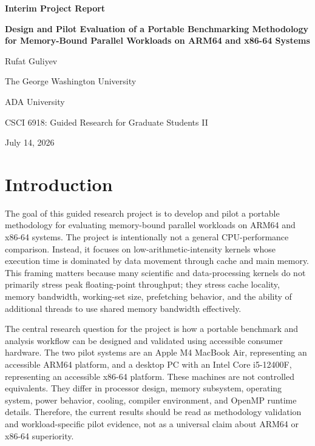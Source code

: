 \documentclass[11pt]{article}
\newcommand{\projecttitle}{Design and Pilot Evaluation of a Portable Benchmarking Methodology for Memory-Bound Parallel Workloads on ARM64 and x86-64 Systems}
\begin{document}
\begin{titlepage}
\centering
\vspace*{1.0in}
{\Large \textbf{Interim Project Report}\par}
\vspace{0.5in}
{\large \textbf{\projecttitle}\par}
\vspace{0.8in}
{\large Rufat Guliyev\par}
\vspace{0.25in}
{\large The George Washington University\par}
{\large ADA University\par}
\vspace{0.25in}
{\large CSCI 6918: Guided Research for Graduate Students II\par}
\vfill
{\large July 14, 2026\par}
\end{titlepage}

\section{Introduction}

The goal of this guided research project is to develop and pilot a portable methodology for evaluating memory-bound parallel workloads on ARM64 and x86-64 systems. The project is intentionally not a general CPU-performance comparison. Instead, it focuses on low-arithmetic-intensity kernels whose execution time is dominated by data movement through cache and main memory. This framing matters because many scientific and data-processing kernels do not primarily stress peak floating-point throughput; they stress cache locality, memory bandwidth, working-set size, prefetching behavior, and the ability of additional threads to use shared memory bandwidth effectively.

The central research question for the project is how a portable benchmark and analysis workflow can be designed and validated using accessible consumer hardware. The two pilot systems are an Apple M4 MacBook Air, representing an accessible ARM64 platform, and a desktop PC with an Intel Core i5-12400F, representing an accessible x86-64 platform. These machines are not controlled equivalents. They differ in processor design, memory subsystem, operating system, power behavior, cooling, compiler environment, and OpenMP runtime details. Therefore, the current results should be read as methodology validation and workload-specific pilot evidence, not as a universal claim about ARM64 or x86-64 superiority.
\end{document}
